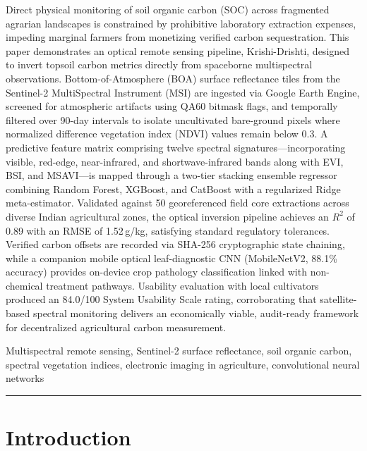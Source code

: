 \documentclass[a4paper,10pt]{article}
\begin{document}
\noindent
Direct physical monitoring of soil organic carbon (SOC) across fragmented agrarian landscapes is constrained by prohibitive laboratory extraction expenses, impeding marginal farmers from monetizing verified carbon sequestration. This paper demonstrates an optical remote sensing pipeline, Krishi-Drishti, designed to invert topsoil carbon metrics directly from spaceborne multispectral observations. Bottom-of-Atmosphere (BOA) surface reflectance tiles from the Sentinel-2 MultiSpectral Instrument (MSI) are ingested via Google Earth Engine, screened for atmospheric artifacts using QA60 bitmask flags, and temporally filtered over 90-day intervals to isolate uncultivated bare-ground pixels where normalized difference vegetation index (NDVI) values remain below 0.3. A predictive feature matrix comprising twelve spectral signatures---incorporating visible, red-edge, near-infrared, and shortwave-infrared bands along with EVI, BSI, and MSAVI---is mapped through a two-tier stacking ensemble regressor combining Random Forest, XGBoost, and CatBoost with a regularized Ridge meta-estimator. Validated against 50 georeferenced field core extractions across diverse Indian agricultural zones, the optical inversion pipeline achieves an $R^2$ of 0.89 with an RMSE of 1.52\,g/kg, satisfying standard regulatory tolerances. Verified carbon offsets are recorded via SHA-256 cryptographic state chaining, while a companion mobile optical leaf-diagnostic CNN (MobileNetV2, 88.1\% accuracy) provides on-device crop pathology classification linked with non-chemical treatment pathways. Usability evaluation with local cultivators produced an 84.0/100 System Usability Scale rating, corroborating that satellite-based spectral monitoring delivers an economically viable, audit-ready framework for decentralized agricultural carbon measurement.

\vspace{4pt}
 Multispectral remote sensing, Sentinel-2 surface reflectance, soil organic carbon, spectral vegetation indices, electronic imaging in agriculture, convolutional neural networks

\vspace{8pt}
\hrule
\vspace{8pt}

\section{Introduction}
\end{document}
